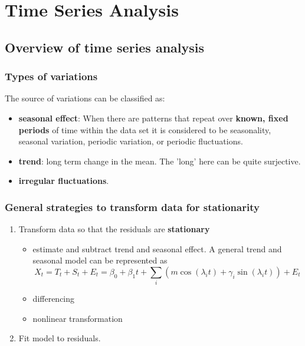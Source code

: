 \startcontents[chapters]
\chapter{Time Series Analysis}\label{ch:time-series-analysis}
	
\section{Overview of time series analysis}
\subsection{Types of variations}
The source of variations can be classified as: \cite[10]{chatfield2003analysis}
\begin{itemize}
    \item \textbf{seasonal effect}:\cite{wiki:seasonality} When there are patterns that repeat over \textbf{known, fixed periods} of time within the data set it is considered to be seasonality, seasonal variation, periodic variation, or periodic fluctuations. 
    \item \textbf{trend}: long term change in the mean. The 'long' here can be quite surjective.
    \item \textbf{irregular fluctuations}.
\end{itemize}


\subsection{General strategies to transform data for stationarity}
\begin{mdframed}
\begin{enumerate}
\item Transform data so that the residuals are \textbf{stationary}
\begin{itemize}
    \item estimate and subtract trend and seasonal effect. A general trend and seasonal model can be represented as
    $$X_t = T_t + S_t + E_t = \beta_0 + \beta_1 t + \sum_i (m \cos(\lambda_i t) + \gamma_i \sin(\lambda_i t)) + E_t$$
    \item differencing
    \item nonlinear transformation
\end{itemize}
\item Fit model to residuals.
\end{enumerate}
\end{mdframed}


